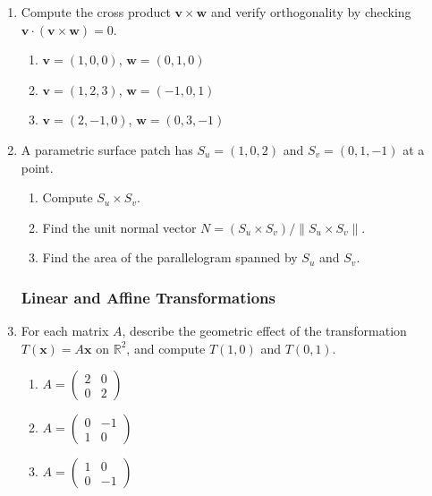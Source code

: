 \begin{enumerate}
\subsubsection*{Cross Product and Surface Normals}

\item Compute the cross product $\mathbf{v} \times \mathbf{w}$ and verify orthogonality
by checking $\mathbf{v} \cdot (\mathbf{v} \times \mathbf{w}) = 0$.
\begin{enumerate}
  \item $\mathbf{v} = (1, 0, 0)$, $\mathbf{w} = (0, 1, 0)$
  \item $\mathbf{v} = (1, 2, 3)$, $\mathbf{w} = (-1, 0, 1)$
  \item $\mathbf{v} = (2, -1, 0)$, $\mathbf{w} = (0, 3, -1)$
\end{enumerate}

\item A parametric surface patch has $S_u = (1, 0, 2)$ and $S_v = (0, 1, -1)$
at a point.
\begin{enumerate}
  \item Compute $S_u \times S_v$.
  \item Find the unit normal vector $N = (S_u \times S_v)/\|S_u \times S_v\|$.
  \item Find the area of the parallelogram spanned by $S_u$ and $S_v$.
\end{enumerate}

\subsubsection*{Linear and Affine Transformations}

\item For each matrix $A$, describe the geometric effect of the transformation
$T(\mathbf{x}) = A\mathbf{x}$ on $\mathbb{R}^2$, and compute $T(1, 0)$ and $T(0, 1)$.
\begin{enumerate}
  \item $A = \begin{pmatrix} 2 & 0 \\ 0 & 2 \end{pmatrix}$

  \item $A = \begin{pmatrix} 0 & -1 \\ 1 & 0 \end{pmatrix}$

  \item $A = \begin{pmatrix} 1 & 0 \\ 0 & -1 \end{pmatrix}$
\end{enumerate}


\end{enumerate}
